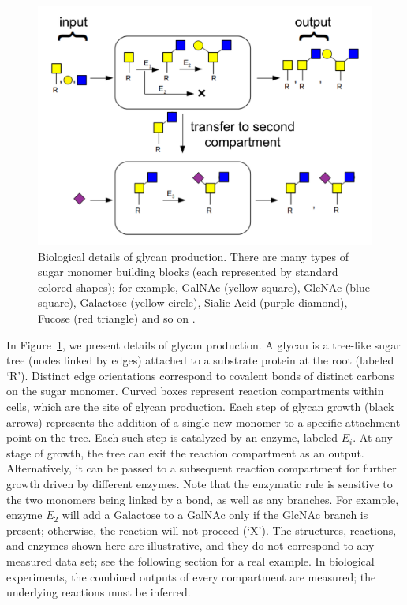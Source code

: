 \begin{figure}[t]
  \centering
  \begin{minipage}{0.54\linewidth}
    \includegraphics[width=0.9\linewidth]{gfig1.png}    
  \end{minipage}
  \begin{minipage}{0.44\linewidth}
    \caption{Biological details of glycan production. There are many types of sugar monomer building blocks (each represented by standard colored shapes); for example, GalNAc (yellow square), GlcNAc (blue square), Galactose (yellow circle), Sialic Acid (purple diamond), Fucose (red triangle) and so on \cite{Varki2017}.}
    \label{fig:glycan-rule}
  \end{minipage}
\vspace{-9mm}
\end{figure}

In Figure~\ref{fig:glycan-rule}, we present details of glycan production. A glycan is a tree-like sugar tree (nodes linked by edges) attached to a substrate protein at the root (labeled `R'). Distinct edge orientations correspond to covalent bonds of distinct carbons on the sugar monomer. Curved boxes represent reaction compartments within cells, which are the site of glycan production. Each step of glycan growth (black arrows) represents the addition of a single new monomer to a specific attachment point on the tree. Each such step is catalyzed by an enzyme, labeled $E_i$. At any stage of growth, the tree can exit the reaction compartment as an output. Alternatively, it can be passed to a subsequent reaction compartment for further growth driven by different enzymes. Note that the enzymatic rule is sensitive to the two monomers being linked by a bond, as well as any branches. For example, enzyme $E_2$ will add a Galactose to a GalNAc only if the GlcNAc branch is present; otherwise, the reaction will not proceed (`X'). The structures, reactions, and enzymes shown here are illustrative, and they do not correspond to any measured data set; see the following section for a real example. In biological experiments, the combined outputs of every compartment are measured; the underlying reactions must be inferred.


